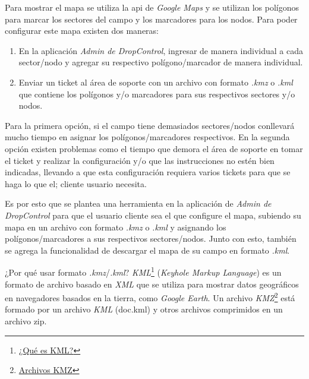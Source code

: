 Para mostrar el mapa se utiliza la api de \textit{Google Maps} y se utilizan los polígonos para marcar los sectores del campo y los marcadores para los nodos.
Para poder configurar este mapa existen dos maneras:
\begin{enumerate}
    \item En la aplicación \textit{Admin de DropControl}, ingresar de manera individual a cada sector/nodo y agregar su respectivo polígono/marcador de manera individual.
    \item Enviar un ticket al área de soporte con un archivo con formato \textit{.kmz} o \textit{.kml} que contiene los polígonos y/o marcadores para sus respectivos sectores y/o nodos.
\end{enumerate}
Para la primera opción, si el campo tiene demasiados sectores/nodos conllevará mucho tiempo en asignar los polígonos/marcadores respectivos.
En la segunda opción existen problemas como el tiempo que demora el área de soporte en tomar el ticket y realizar la configuración y/o
que las instrucciones no estén bien indicadas, llevando a que esta configuración requiera varios tickets para que se haga lo que el; cliente usuario necesita.

Es por esto que se plantea una herramienta en la aplicación de \textit{Admin de DropControl} para que el usuario cliente sea el que
configure el mapa, subiendo su mapa en un archivo con formato \textit{.kmz} o \textit{.kml} y asignando los polígonos/marcadores a sus respectivos sectores/nodos.
Junto con esto, también se agrega la funcionalidad de descargar el mapa de su campo en formato \textit{.kml}.

¿Por qué usar formato \textit{.kmz}/\textit{.kml}? \textit{KML}\footnote{\href{https://pro.arcgis.com/es/pro-app/latest/help/data/kml/what-is-kml-.htm}{¿Qué es KML?}} (\textit{Keyhole Markup Language}) es un formato de archivo basado en \textit{XML} que se utiliza para mostrar datos geográficos en navegadores basados en la tierra, como \textit{Google Earth}. Un archivo \textit{KMZ}\footnote{\href{https://developers.google.com/kml/documentation/kmzarchives?hl=es-419}{Archivos KMZ}} está formado por un archivo \textit{KML} (doc.kml) y otros archivos comprimidos en un archivo zip.

